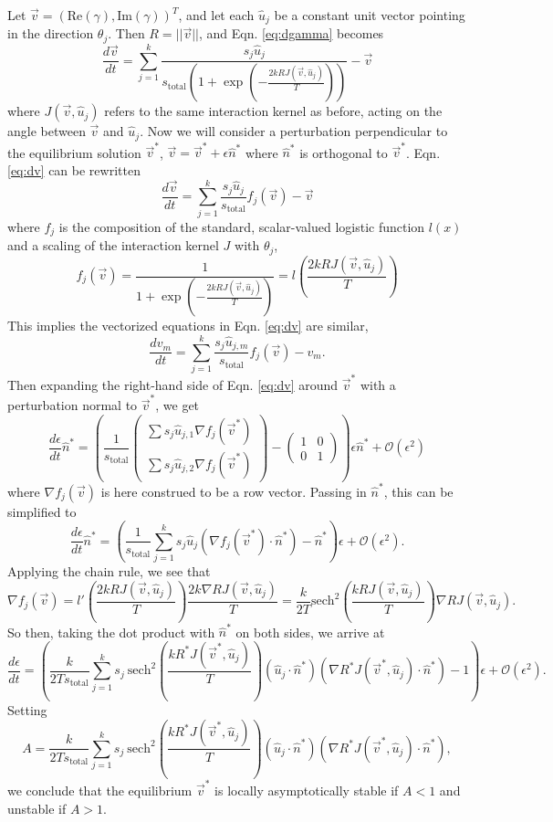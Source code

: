 \documentclass[12pt]{article}
\begin{document}
Let $\vec{v} = (\text{Re}(\gamma),\text{Im}(\gamma))^T$, and let each $\hat{u}_j$ be a constant unit vector pointing in the direction $\theta_j$. Then $R=||\vec{v}||$, and Eqn. \ref{eq:dgamma} becomes
\begin{equation}
\frac{d\vec{v}}{dt} = \sum_{j=1}^{k}\frac{s_j\hat{u}_j}{s_{\text{total}}\left(1+\exp\left(-\frac{2kRJ(\vec{v},\hat{u}_j)}{T}\right)\right)} - \vec{v}\label{eq:dv}
\end{equation}
where $J(\vec{v},\hat{u}_j)$ refers to the same interaction kernel as before, acting on the angle between $\vec{v}$ and $\hat{u}_j$. Now we will consider a perturbation perpendicular to the equilibrium solution $\vec{v}^*$, $\vec{v} = \vec{v}^* + \epsilon \hat{n}^*$ where $\hat{n}^*$ is orthogonal to $\vec{v}^*$. Eqn. \eqref{eq:dv} can be rewritten
\[
\frac{d\vec{v}}{dt} = \sum_{j=1}^{k}\frac{s_j\hat{u}_j}{s_{\text{total}}}f_j(\vec{v}) - \vec{v}
\]
where $f_j$ is the composition of the standard, scalar-valued logistic function $l(x)$ and a scaling of the interaction kernel $J$ with $\theta_j$,
\[
f_j(\vec{v}) = \frac{1}{1 + \exp\left(-\frac{2kRJ(\vec{v},\hat{u}_j)}{T}\right)} = l\left(\frac{2kRJ(\vec{v},\hat{u}_j)}{T}\right)
\]
This implies the vectorized equations in Eqn. \eqref{eq:dv} are similar,
\[
\frac{dv_m}{dt} = \sum_{j=1}^{k}\frac{s_j\hat{u}_{j,m}}{s_{\text{total}}}f_j(\vec{v}) - v_m.
\]
Then expanding the right-hand side of Eqn. \eqref{eq:dv} around $\vec{v}^*$ with a perturbation normal to $\vec{v}^*$, we get
\[
\frac{d\epsilon}{dt}\hat{n}^* = \left(\frac{1}{s_{\text{total}}}\left(\begin{array}{c}
	\sum s_j\hat{u}_{j,1}\nabla f_j(\vec{v}^*)	\\
	\sum s_j\hat{u}_{j,2}\nabla f_j(\vec{v}^*)
\end{array}\right) - \left(\begin{array}{cc}
1 & 0 \\
0 & 1
\end{array}\right)\right)\epsilon\hat{n}^* + \mathcal{O}(\epsilon^2)
\]
where $\nabla f_j(\vec{v})$ is here construed to be a row vector. Passing in $\hat{n}^*$, this can be simplified to
\[
\frac{d\epsilon}{dt}\hat{n}^* = \left(\frac{1}{s_{\text{total}}}\sum_{j=1}^{k}s_j\hat{u}_j(\nabla f_j(\vec{v}^*)\cdot\hat{n}^*)
- \hat{n}^*\right)\epsilon + \mathcal{O}(\epsilon^2).
\]
Applying the chain rule, we see that
\[
\nabla f_j(\vec{v}) = l'\left(\frac{2kRJ(\vec{v},\hat{u}_j)}{T}\right)\frac{2k\nabla RJ(\vec{v},\hat{u}_j)}{T} = \frac{k}{2T}\text{sech}^2\left(\frac{kRJ(\vec{v},\hat{u}_j)}{T}\right)\nabla RJ(\vec{v},\hat{u}_j).
\]
So then, taking the dot product with $\hat{n}^*$ on both sides, we arrive at
\[
\frac{d\epsilon}{dt} = \left(\frac{k}{2Ts_{\text{total}}}\sum_{j=1}^{k}s_j\ \text{sech}^2\left(\frac{kR^*J(\vec{v}^*,\hat{u}_j)}{T}\right)(\hat{u}_j\cdot\hat{n}^*)(\nabla R^*J(\vec{v}^*,\hat{u}_j)\cdot\hat{n}^*)
- 1\right)\epsilon + \mathcal{O}(\epsilon^2).
\]
Setting
\[
A = \frac{k}{2Ts_{\text{total}}}\sum_{j=1}^{k}s_j\ \text{sech}^2\left(\frac{kR^*J(\vec{v}^*,\hat{u}_j)}{T}\right)(\hat{u}_j\cdot\hat{n}^*)(\nabla R^*J(\vec{v}^*,\hat{u}_j)\cdot\hat{n}^*),
\]
we conclude that the equilibrium $\vec{v}^*$ is locally asymptotically stable if $A<1$ and unstable if $A>1$.
\end{document}
